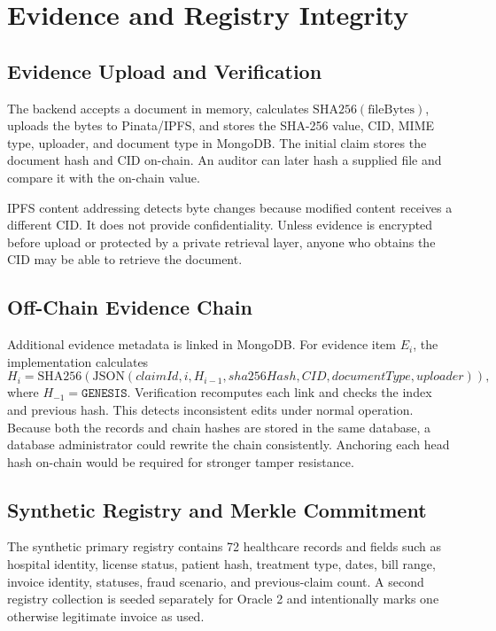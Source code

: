 \section{Evidence and Registry Integrity}
\label{sec:evidence_registry}

\subsection{Evidence Upload and Verification}

The backend accepts a document in memory, calculates
\(\mathrm{SHA256}(\mathrm{fileBytes})\), uploads the bytes to Pinata/IPFS, and
stores the SHA-256 value, CID, MIME type, uploader, and document type in
MongoDB. The initial claim stores the document hash and CID on-chain. An auditor
can later hash a supplied file and compare it with the on-chain value.

IPFS content addressing detects byte changes because modified content receives a
different CID. It does not provide confidentiality. Unless evidence is
encrypted before upload or protected by a private retrieval layer, anyone who
obtains the CID may be able to retrieve the document.

\subsection{Off-Chain Evidence Chain}

Additional evidence metadata is linked in MongoDB. For evidence item \(E_i\),
the implementation calculates
\begin{equation}
H_i=\mathrm{SHA256}\left(
\mathrm{JSON}(claimId,i,H_{i-1},sha256Hash,CID,documentType,uploader)
\right),
\label{eq:evidence_chain}
\end{equation}
where \(H_{-1}=\texttt{GENESIS}\). Verification recomputes each link and checks
the index and previous hash. This detects inconsistent edits under normal
operation. Because both the records and chain hashes are stored in the same
database, a database administrator could rewrite the chain consistently.
Anchoring each head hash on-chain would be required for stronger tamper
resistance.

\subsection{Synthetic Registry and Merkle Commitment}

The synthetic primary registry contains 72 healthcare records and fields such as
hospital identity, license status, patient hash, treatment type, dates, bill
range, invoice identity, statuses, fraud scenario, and previous-claim count. A
second registry collection is seeded separately for Oracle 2 and intentionally
marks one otherwise legitimate invoice as used.


